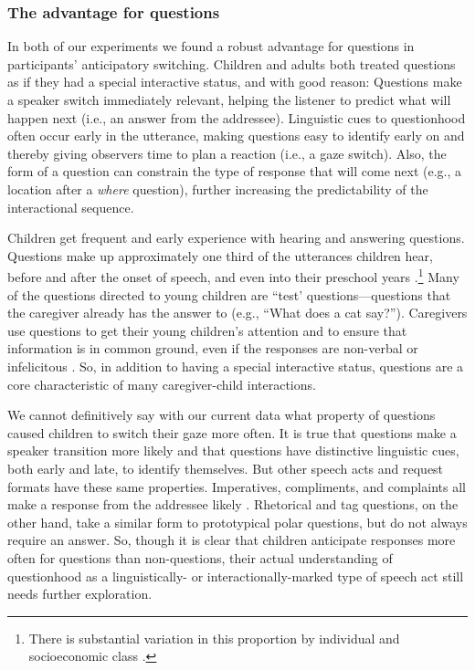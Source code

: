 \documentclass[authoryear, 12pt]{elsarticle}
\begin{document}
\subsubsection{The advantage for questions}

In both of our experiments we found a robust advantage for questions in participants' anticipatory switching. Children and adults both treated questions as if they had a special interactive status, and with good reason: Questions make a speaker switch immediately relevant, helping the listener to predict what will happen next (i.e., an answer from the addressee). Linguistic cues to questionhood often occur early in the utterance, making questions easy to identify early on and thereby giving observers time to plan a reaction (i.e., a gaze switch). Also, the form of a question can constrain the type of response that will come next (e.g., a location after a \textit{where} question), further increasing the predictability of the interactional sequence.

Children get frequent and early experience with hearing and answering questions. Questions make up approximately one third of the utterances children hear, before and after the onset of speech, and even into their preschool years \citep{fitneva2012, henning2005, shatz1979}.\footnote{There is substantial variation in this proportion by individual and socioeconomic class \citep{hart1992}.} Many of the questions directed to young children are ``test' questions---questions that the caregiver already has the answer to (e.g., ``What does a cat say?''). Caregivers use questions to get their young children's attention and to ensure that information is in common ground, even if the responses are non-verbal or infelicitous \citep{fitneva2012, snow1977}. So, in addition to having a special interactive status, questions are a core characteristic of many caregiver-child interactions.

We cannot definitively say with our current data what property of questions caused children to switch their gaze more often. It is true that questions make a speaker transition more likely and that questions have distinctive linguistic cues, both early and late, to identify themselves. But other speech acts and request formats have these same properties. Imperatives, compliments, and complaints all make a response from the addressee likely \citep{schegloff2007}. Rhetorical and tag questions, on the other hand, take a similar form to prototypical polar questions, but do not always require an answer. So, though it is clear that children anticipate responses more often for questions than non-questions, their actual understanding of questionhood as a linguistically- or interactionally-marked type of speech act still needs further exploration.
\end{document}
